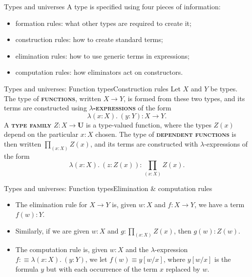 \documentclass{beamer}
\newcommand{\defn}[1]{{\scshape\bfseries\color{MPBemph}#1}}
\newcommand{\eql}{\mathbin{:\equiv}}
\newcommand{\U}{\textbf{U}}
\newcommand{\tpi}[1]{\prod_{(#1)}}
\newcommand{\1}{\textbf{1}}
\newcommand{\0}{\mathbf{0}}
\newcommand{\2}{\textbf{2}}
\begin{document}
\begin{frame}{Types and universes}
A type is specified using four pieces of information:
\begin{itemize}
	\item<1> \alert<1>{formation rules}: what other types are required to create it;
	\item<2> \alert<2>{construction rules}: how to create standard terms;
	\item<3> \alert<3>{elimination rules}: how to use generic terms in expressions;
	\item<4> \alert<4>{computation rules}: how eliminators act on constructors.
\end{itemize}
\end{frame}
\begin{frame}{Types and universes: Function types}{Construction rules}
Let \( X \) and \( Y \) be types. The type of \defn{functions}, written \( X \to Y \), is formed from these two types, and its terms are constructed using \defn{\( \lambda \)-expressions} of the form
\[ \lambda(x : X).~ (y : Y) : X \to Y. \]
\pause
A \defn{type family} \( Z : X \to \U \) is a type-valued function, where the types \( Z(x) \) depend on the particular \( x : X \) chosen. The type of \defn{dependent functions} is then written \( \tpi{x : X} Z(x) \), and its terms are constructed with \( \lambda \)-expressions of the form
\[ \lambda(x : X).~ (z : Z(x)) : \tpi{x : X} Z(x). \]
\end{frame}
\begin{frame}{Types and universes: Function types}{Elimination \& computation rules}
\begin{itemize}[<+- >]
	\item The elimination rule for \( X \to Y \) is, given \( w : X \) and \( f : X \to Y \), we have a term \( f(w) : Y \).
	\item Similarly, if we are given \( w : X \) and \( g : \tpi{x : X} Z(x) \), then \( g(w) : Z(w) \).
	\item The computation rule is, given \( w : X \) and the \( \lambda \)-expression \( f \eql \lambda(x : X).~ (y : Y) \), we let \( f(w) \equiv y[w/x] \), where \( y[w/x] \) is the formula \( y \) but with each occurrence of the term \( x \) replaced by \( w \).
\end{itemize} \end{frame}
\end{document}
